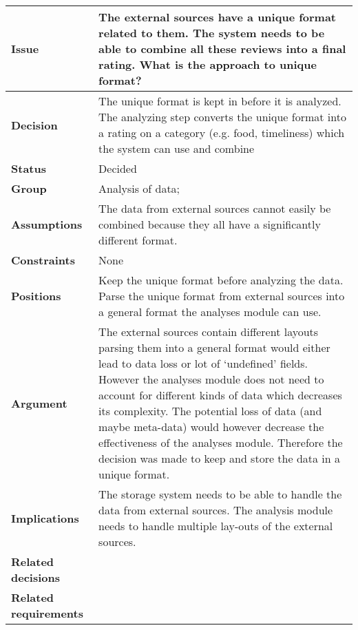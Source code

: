 
{\large{}}
\begin{tabular}{ l  p{10cm}}
\hline
\bf Issue & The external sources have a unique format related to them. The system needs to be able to combine all these reviews into a final rating. What is the approach to unique format?\\
\hline
\bf Decision & The unique format is kept in before it is analyzed. The analyzing step converts the unique format into a rating on a category (e.g. food, timeliness) which the system can use and combine \\
\hline
\bf Status & Decided\\
\hline
\bf Group & Analysis of data; \\
\hline
\bf Assumptions & The data from external sources cannot easily be combined because they all have a significantly different format.  \\
\hline
\bf Constraints & None \\
\hline
\bf Positions & Keep the unique format before analyzing the data. \newline\newline
Parse the unique format from external sources into a general format the analyses module can use. 
 \\
\hline
\bf Argument & The external sources contain different layouts parsing them into a general format would either lead to data loss or lot of ‘undefined’ fields. However the analyses module does not need to account for different kinds of data which decreases its complexity. The potential loss of data (and maybe meta-data)  would however decrease the effectiveness of the analyses module. Therefore the decision was made to keep and store the data in a unique format.  \\
\hline
\bf Implications & The storage system needs to be able to handle the data from external sources. The analysis module needs to handle multiple lay-outs of the external sources.  \\
\hline
\bf Related decisions & \\
\hline
\bf Related requirements  & \\
\hline
\end{tabular}

